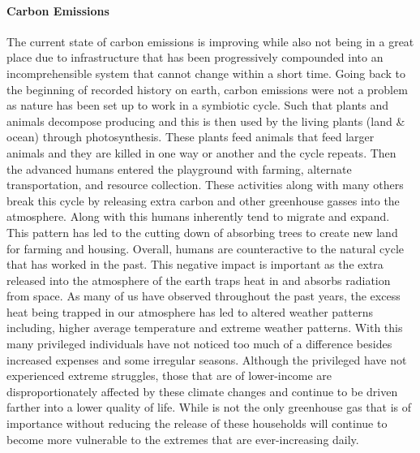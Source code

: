 \documentclass[3p,sort]{elsarticle}
\begin{document}
\paragraph{Carbon Emissions} The current state of carbon emissions is improving while also not 
being in a great place due to infrastructure that has been progressively compounded into an 
incomprehensible system that cannot change within a short time. Going back to the beginning of 
recorded history on earth, carbon emissions
were not a problem as nature has been set up to work in a symbiotic cycle. Such that plants 
and animals decompose producing  and this  is then used by the living plants 
(land \& ocean) through photosynthesis. These plants feed animals that feed larger animals and 
they are killed in one way or another and the cycle repeats. Then the advanced humans entered 
the playground with farming, alternate transportation, and resource collection. These activities 
along with many others break this cycle by releasing extra carbon and other greenhouse gasses 
into the atmosphere. Along with this humans inherently tend to migrate and expand. 
This pattern has led to the cutting down of  absorbing trees to create new land for 
farming and housing. Overall, humans are counteractive to the natural cycle that has worked in 
the past. This negative impact is important as the extra released  into the atmosphere 
of the earth traps heat in and absorbs radiation from space. 
As many of us have observed throughout the past years, the excess heat being trapped in our 
atmosphere has led to altered weather patterns including, 
higher average temperature and extreme weather patterns. With this many privileged individuals 
have not noticed too much of a difference besides increased expenses and some irregular seasons. 
Although the privileged have not experienced extreme struggles, those that are of lower-income are 
disproportionately affected by these climate changes and continue to be driven farther into a lower 
quality of life. While  is not the only greenhouse gas that is of importance without reducing 
the release of  these households will continue to become more vulnerable to the extremes that 
are ever-increasing daily.

 \citep{carbon}

 
\end{document}
